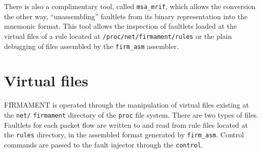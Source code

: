 \documentclass[11pt]{article}
\begin{document}
There is also a complimentary tool, called \texttt{msa\_mrif}, which allows the conversion the other way, ``unassembling'' faultlets from its binary representation into the mnemonic format. This tool allows the inspection of faultlets loaded at the virtual files of a rule located at \texttt{/proc/net/firmament/rules} or the plain debugging of files assembled by the \texttt{firm\_asm} assembler.


\section{Virtual files}\label{sec:arqvirtuais}

\textsf{FIRMAMENT} is operated through the manipulation of virtual files existing at the \texttt{net/} \texttt{firmament} directory of the \texttt{proc} file system. There are two types of files. Faultlets for each packet flow are written to and read from \textsf{rule files} located at the \texttt{rules} directory, in the assembled format generated by \texttt{firm\_asm}. Control commands are passed to the fault injector through the \texttt{control}. 
\end{document}

